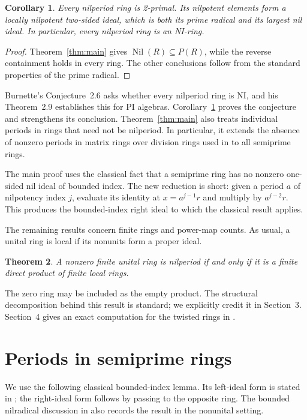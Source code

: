 \documentclass[11pt]{article}
\newtheorem{theorem}{Theorem}
\newtheorem{corollary}[theorem]{Corollary}
\theoremstyle{remark}
\DeclareMathOperator{\Nil}{Nil}
\begin{document}
\begin{corollary}\label{cor:nilperiod}
Every nilperiod ring is 2-primal. Its nilpotent elements form a locally
nilpotent two-sided ideal, which is both its prime radical and its largest nil
ideal. In particular, every nilperiod ring is an NI-ring.
\end{corollary}
\begin{proof}
Theorem~\ref{thm:main} gives $\Nil(R)\subseteq P(R)$, while the reverse
containment holds in every ring. The other conclusions follow from the
standard properties of the prime radical.
\end{proof}

Burnette's Conjecture~2.6 asks whether every nilperiod ring is NI, and his
Theorem~2.9 establishes this for PI algebras. Corollary~\ref{cor:nilperiod}
proves the conjecture and strengthens its conclusion. Theorem~\ref{thm:main}
also treats individual periods in rings that need not be nilperiod. In
particular, it extends the absence of nonzero periods in matrix rings over
division rings used in \cite[Lemma~2.8]{Burnette} to all semiprime rings.

The main proof uses the classical fact that a semiprime ring has no nonzero
one-sided nil ideal of bounded index. The new reduction is short: given a
period $a$ of nilpotency index $j$, evaluate its identity at
$x=a^{j-1}r$ and multiply by $a^{j-2}r$. This produces the bounded-index
right ideal to which the classical result applies.

The remaining results concern finite rings and power-map counts. As usual,
a unital ring is local if its nonunits form a proper ideal.
\begin{theorem}\label{thm:finite}
A nonzero finite unital ring is nilperiod if and only if it is a finite direct
product of finite local rings.
\end{theorem}
The zero ring may be included as the empty product. The structural
decomposition behind this result is standard; we explicitly credit it in
Section~3. Section~4 gives an exact computation for the twisted rings in
\cite[Example~2.2]{Burnette}.

\section{Periods in semiprime rings}
We use the following classical bounded-index lemma. Its left-ideal form is
stated in \cite[p.~93, item~(V)]{BM}; the right-ideal form follows by passing
to the opposite ring. The bounded nilradical discussion in
\cite[Section~1]{Nielsen} also records the result in the nonunital setting.
\end{document}
